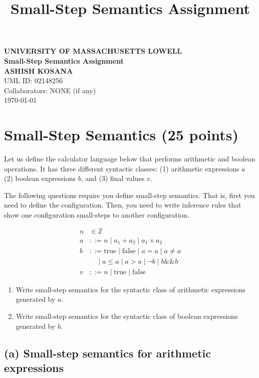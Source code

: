 \documentclass[12pt]{article}
\title{Small-Step Semantics Assignment}
\author{}
\date{}
\begin{document}
\begin{center}
    \textbf{\LARGE UNIVERSITY OF MASSACHUSETTS   LOWELL} \\[2cm]
    \textbf{\Large Small-Step Semantics Assignment} \\[2cm]
    \textbf{ASHISH KOSANA} \\[0.5cm]
    UML ID: 02148256 \\[0.5cm]
    Collaborators: NONE (if any) \\[2cm]
    \vfill
    \today
\end{center}

\newpage

\section{Small-Step Semantics (25 points)}

Let us define the calculator language below that performs arithmetic and boolean operations. It has three different syntactic classes: (1) arithmetic expressions $a$ (2) boolean expressions $b$, and (3) final values $v$.

The following questions require you define small-step semantics. That is, first you need to define the configuration. Then, you need to write inference rules that show one configuration small-steps to another configuration.

\begin{align*}
n &\in \mathbb{Z} \\
a &::= n \mid a_1 + a_2 \mid a_1 \times a_2 \\
b &::= \text{true} \mid \text{false} \mid a = a \mid a \neq a \\
  &\quad \mid a \leq a \mid a > a \mid \neg b \mid b \&\& b \\
v &::= n \mid \text{true} \mid \text{false}
\end{align*}

\begin{enumerate}[label=(\alph*)]
\item Write small-step semantics for the syntactic class of arithmetic expressions generated by $a$.
\item Write small-step semantics for the syntactic class of boolean expressions generated by $b$.
\end{enumerate}

\subsection*{(a) Small-step semantics for arithmetic expressions}
\end{document}
